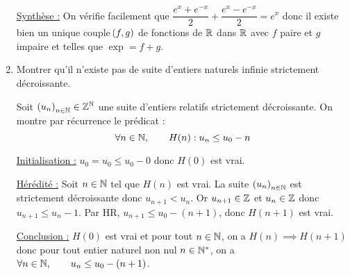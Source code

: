 \documentclass[a4paper,french,bookmarks]{book}
\begin{document}
\begin{enumerate}
{            \underline{Synthèse :} On vérifie facilement que $\dfrac{e^x + e^{-x}}{2} + \dfrac{e^x - e^{-x}}{2} = e^x$ donc il existe bien un unique couple $\!\left(f, g\right)$ de fonctions de $\mathbb{R}$ dans $\mathbb{R}$ avec $f$ paire et $g$ impaire et telles que $\exp = f + g$.
        }
        
    \item Montrer qu'il n'existe pas de suite d'entiers naturels infinie strictement décroissante.
    
    \noafter
    \nobefore
    \begin{nproof}
         Soit ${\left(u_n\right)_{n \in \mathbb{N}}} \in \mathbb{Z}^{\mathbb{N}}$ une suite d'entiers relatifs strictement décroissante. On montre par récurrence le prédicat :
        \[ \forall n \in \mathbb{N},\qquad H(n) : u_n \leq u_0 - n \]
        \begin{enumerate}
            \itt \underline{Initialisation :} $u_0 = u_0 \leq u_0 - 0$ donc $H(0)$ est vrai.
            
            \itt \underline{Hérédité :} Soit $n \in \mathbb{N}$ tel que $H(n)$ est vrai. La suite ${\left(u_n\right)_{n \in \mathbb{N}}}$ est strictement décroissante donc $u_{n+1} < u_n$. Or $u_{n+1} \in \mathbb{Z}$ et $u_n \in \mathbb{Z}$ donc $u_{n+1} \leq u_n - 1$. Par HR, $u_{n+1} \leq u_0 - (n+1)$, donc $H(n+1)$ est vrai.
            
            \itt \underline{Conclusion :} $H(0)$ est vrai et pour tout $n \in \mathbb{N}$, on a $H(n) \implies H(n+1)$ donc pour tout entier naturel non nul $n \in \mathbb{N}^*$, on a $\forall n \in \mathbb{N},\qquad u_n \leq u_0 - (n+1)$.
        \end{enumerate}
    \end{nproof}
    \yesafter
\end{enumerate}
\end{document}
